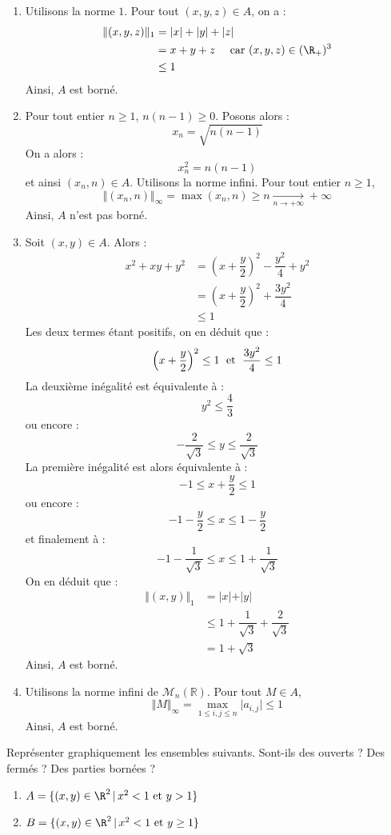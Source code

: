 \documentclass[a4paper,10pt]{report}
\begin{document}
\corr 
\begin{enumerate}
\item Utilisons la norme $1$. Pour tout $(x,y,z) \in A$, on a :
\begin{align*}
\Vert (x,y,z) \Vert_1 & = \vert x \vert + \vert y \vert + \vert z \vert \\
& = x+y+z \quad \hbox{ car } (x,y,z) \in  (\R_+)^3 \\
&  \leq 1
\end{align*}
Ainsi, $A$ est borné.
\item Pour tout entier $n \geq 1$, $ n(n-1) \geq 0$. Posons alors :
$$ x_n = \sqrt{n(n-1)}$$
On a alors :
$$ x_n^2= n(n-1)$$
et ainsi $(x_n,n) \in A$. Utilisons la norme infini. Pour tout entier $n \geq 1$,
$$ \Vert (x_n,n) \Vert_{\infty} = \max(x_n,n) \geq n \underset{n \rightarrow + \infty}{\longrightarrow} + \infty$$
Ainsi, $A$ n'est pas borné.
\item Soit $(x,y) \in A$. Alors :
\begin{align*}
x^2+xy+y^2 & = \left( x+\dfrac{y}{2}  \right)^2 - \dfrac{y^2}{4}+ y^2 \\
& = \left( x+\dfrac{y}{2}  \right)^2  + \dfrac{3y^2}{4} \\
& \leq 1
\end{align*}
Les deux termes étant positifs, on en déduit que :
$$ \left( x+\dfrac{y}{2}  \right)^2 \leq 1 \; \hbox{ et } \; \dfrac{3y^2}{4} \leq 1 $$
La deuxième inégalité est équivalente à :
$$ y^2 \leq \dfrac{4}{3}$$
ou encore :
$$ - \dfrac{2}{\sqrt{3}} \leq y \leq \dfrac{2}{\sqrt{3}}$$
La première inégalité est alors équivalente à :
$$ -1 \leq x+\dfrac{y}{2} \leq 1 $$
ou encore :
$$ -1 - \dfrac{y}{2} \leq x \leq 1- \dfrac{y}{2}$$
et finalement à :
$$ -1 - \dfrac{1}{\sqrt{3}} \leq x \leq 1 + \dfrac{1}{\sqrt{3}}$$
On en déduit que :
\begin{align*}
\Vert (x,y) \Vert_1 & = \vert x \vert + \vert y \vert \\
& \leq 1+ \dfrac{1}{\sqrt{3}} + \dfrac{2}{\sqrt{3}} \\
& = 1 + \sqrt{3}
\end{align*}
Ainsi, $A$ est borné.
\item Utilisons la norme infini de $\mathcal{M}_n(\mathbb{R})$. Pour tout $M \in A$,
$$ \Vert M \Vert_{\infty} = \max_{1 \leq i,j \leq n} \vert a_{i,j} \vert  \leq 1$$
Ainsi, $A$ est borné.
\end{enumerate}

\begin{Exercice}{} Repr\'esenter graphiquement les ensembles suivants. Sont-ils des ouverts ? Des ferm\'es ? Des parties bornées ?
\begin{enumerate}
\item $A = \lbrace (x,y)\in\R^2 \, \vert \, x^2 < 1 \hbox{ et } y> 1\rbrace$
\item $B = \lbrace (x,y)\in\R^2 \, \vert \, x^2 < 1 \hbox{ et } y \geq 1\rbrace$
\end{enumerate}
\end{Exercice}
\end{document}
